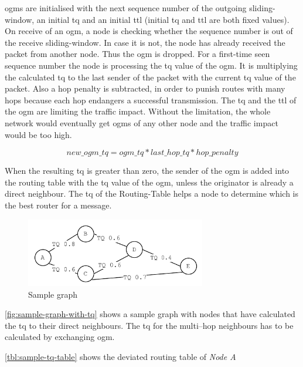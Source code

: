 \glspl{ogm} are initialised with the next sequence number of the outgoing sliding-window, an initial \gls{tq} and an initial \gls{ttl} (initial \gls{tq} and \gls{ttl} are both fixed values). On receive of an \gls{ogm}, a node is checking whether the sequence number is out of the receive sliding-window. In case it is not, the node has already received the packet from another node. Thus the \gls{ogm} is dropped. For a first-time seen sequence number the node is processing the \gls{tq} value of the \gls{ogm}. It is multiplying the calculated \gls{tq} to the last sender of the packet with the current \gls{tq} value of the packet. Also a hop penalty is subtracted, in order to punish routes with many hops because each hop endangers a successful transmission. The \gls{tq} and the \gls{ttl} of the \gls{ogm} are limiting the traffic impact. Without the limitation, the whole network would eventually get \glspl{ogm} of any other node and the traffic impact would be too high.

\begin{equation}
\label{eq:ogm_quality}
new\_ogm\_tq = ogm\_tq * last\_hop\_tq * hop\_penalty
\end{equation}

When the resulting \gls{tq} is greater than zero, the sender of the \gls{ogm} is added into the routing table with the \gls{tq} value of the \gls{ogm}, unless the originator is already a direct neighbour. The \gls{tq} of the Routing-Table helps a node to determine which is the best router for a message.

\begin{figure}
\centering
\includegraphics[width=0.7\textwidth]{graphics/batman.pdf}
\caption{Sample graph}
\label{fig:sample-graph-with-tq}
\end{figure}

\vref{fig:sample-graph-with-tq} shows a sample graph with nodes that have calculated the \gls{tq} to their direct neighbours. The \gls{tq} for the multi–hop neighbours has to be calculated by exchanging \gls{ogm}.

\vref{tbl:sample-tq-table} shows the deviated routing table of \textit{Node A}

